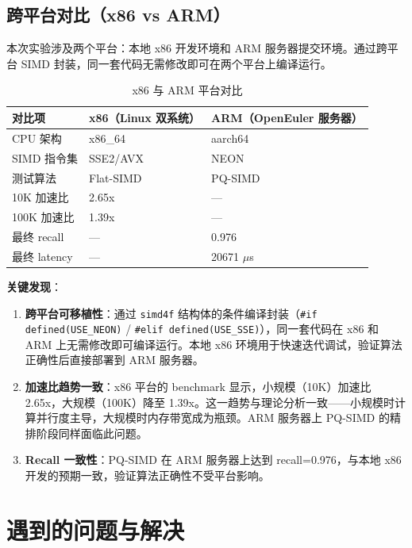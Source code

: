 \documentclass[a4paper]{article}
\begin{document}
\subsection{跨平台对比（x86 vs ARM）}

本次实验涉及两个平台：本地 x86 开发环境和 ARM 服务器提交环境。通过跨平台 SIMD 封装，同一套代码无需修改即可在两个平台上编译运行。

\begin{table}[!htbp]
  \centering
  \begin{tabular}{lll}
  \toprule
  对比项 & x86（Linux 双系统） & ARM（OpenEuler 服务器） \\
  \midrule
  CPU 架构 & x86\_64 & aarch64 \\
  SIMD 指令集 & SSE2/AVX & NEON \\
  测试算法 & Flat-SIMD & PQ-SIMD \\
  10K 加速比 & 2.65x & — \\
  100K 加速比 & 1.39x & — \\
  最终 recall & — & 0.976 \\
  最终 latency & — & 20671 $\mu$s \\
  \bottomrule
  \end{tabular}
  \caption{x86 与 ARM 平台对比}
\end{table}

\textbf{关键发现}：

\begin{enumerate}
  \item \textbf{跨平台可移植性}：通过 \texttt{simd4f} 结构体的条件编译封装（\texttt{\#if defined(USE\_NEON)} / \texttt{\#elif defined(USE\_SSE)}），同一套代码在 x86 和 ARM 上无需修改即可编译运行。本地 x86 环境用于快速迭代调试，验证算法正确性后直接部署到 ARM 服务器。

  \item \textbf{加速比趋势一致}：x86 平台的 benchmark 显示，小规模（10K）加速比 2.65x，大规模（100K）降至 1.39x。这一趋势与理论分析一致——小规模时计算并行度主导，大规模时内存带宽成为瓶颈。ARM 服务器上 PQ-SIMD 的精排阶段同样面临此问题。

  \item \textbf{Recall 一致性}：PQ-SIMD 在 ARM 服务器上达到 recall=0.976，与本地 x86 开发的预期一致，验证算法正确性不受平台影响。
\end{enumerate}

\section{遇到的问题与解决}
\end{document}

